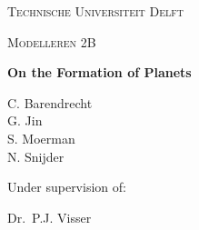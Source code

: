 
\begin{titlepage}


	\centering
	{\scshape\Large {\color{white}Technische Universiteit Delft}\par}
	\vspace{1cm}
	{\scshape\Large {\color{white}Modelleren 2B}\par}
	\vspace{1.5cm}
	{\Huge\bfseries {\color{white}On the Formation of Planets}\par}
	\vspace{2cm}
	{\Large{\color{white}
	C. Barendrecht\\ 
	G. Jin\\
	S. Moerman\\
	N. Snijder}\par}
	\vfill
	{\color{white}Under supervision of:\par
	Dr.~P.J. Visser}

	\vfill
\end{titlepage}
\ClearWallPaper
\blankpage
%